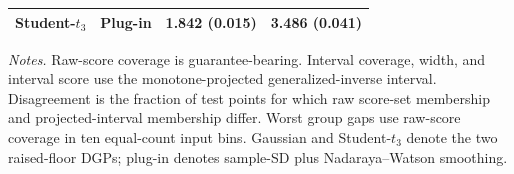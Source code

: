 \begin{table}[p]
\begin{tabular}{@{}llcc@{}}
Student-$t_3$ & Plug-in & 1.842 (0.015) & 3.486 (0.041) \\
\bottomrule
\end{tabular}
\par\medskip
\begin{minipage}{0.98\linewidth}
\footnotesize\textit{Notes.} Raw-score coverage is guarantee-bearing. Interval coverage, width, and interval score use the monotone-projected generalized-inverse interval. Disagreement is the fraction of test points for which raw score-set membership and projected-interval membership differ. Worst group gaps use raw-score coverage in ten equal-count input bins. Gaussian and Student-$t_3$ denote the two raised-floor DGPs; plug-in denotes sample-SD plus Nadaraya--Watson smoothing.
\end{minipage}
\end{table}
